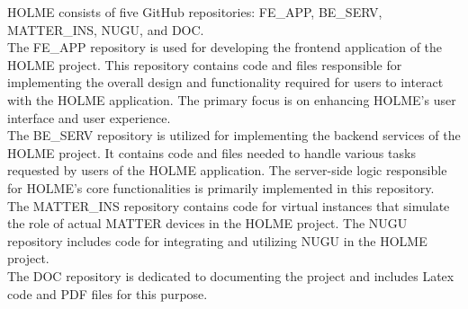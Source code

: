 \documentclass[conference]{IEEEtran}
\begin{document}
HOLME consists of five GitHub repositories: FE\_APP, BE\_SERV, MATTER\_INS, NUGU, and DOC.\\
The FE\_APP repository is used for developing the frontend application of the HOLME project. This repository contains code and files responsible for implementing the overall design and functionality required for users to interact with the HOLME application. The primary focus is on enhancing HOLME's user interface and user experience.\\
The BE\_SERV repository is utilized for implementing the backend services of the HOLME project. It contains code and files needed to handle various tasks requested by users of the HOLME application. The server-side logic responsible for HOLME's core functionalities is primarily implemented in this repository.\\
The MATTER\_INS repository contains code for virtual instances that simulate the role of actual MATTER devices in the HOLME project.
The NUGU repository includes code for integrating and utilizing NUGU in the HOLME project.\\
The DOC repository is dedicated to documenting the project and includes Latex code and PDF files for this purpose.
\end{document}
